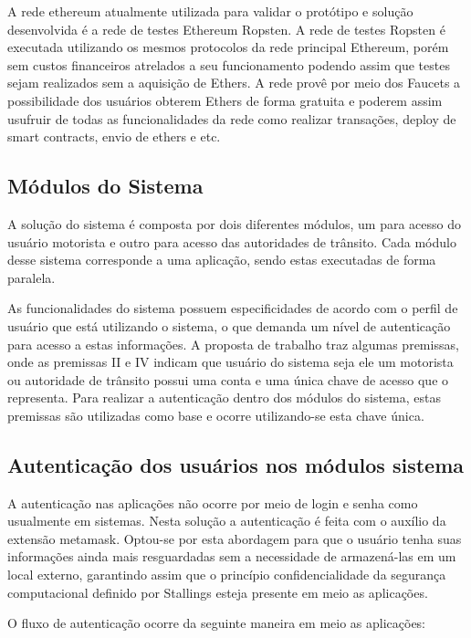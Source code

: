 A rede ethereum atualmente utilizada para validar o protótipo e solução desenvolvida é a rede de testes Ethereum Ropsten. A rede de testes Ropsten é executada utilizando os mesmos protocolos da rede principal Ethereum, porém sem custos financeiros atrelados a seu funcionamento podendo assim que testes sejam realizados sem a aquisição de Ethers. A rede provê por meio dos Faucets  a possibilidade dos usuários obterem Ethers de forma gratuita e poderem assim usufruir de todas as funcionalidades da rede como realizar transações, deploy de smart contracts, envio de ethers e etc.

\subsection{Módulos do Sistema}

A solução do sistema é composta por dois diferentes módulos, um para acesso do usuário motorista e outro para acesso das autoridades de trânsito. Cada módulo desse sistema corresponde a uma aplicação, sendo estas executadas de forma paralela.

As funcionalidades do sistema possuem especificidades de acordo com o perfil de usuário que está utilizando o sistema, o que demanda um nível de autenticação para acesso a estas informações. A proposta de trabalho traz algumas premissas, onde as premissas II e IV indicam que  usuário do sistema seja ele um motorista ou autoridade de trânsito possui uma conta e uma única chave de acesso que o representa. Para realizar a autenticação dentro dos módulos do sistema, estas premissas são utilizadas como base e ocorre utilizando-se esta chave única.

\subsection{Autenticação dos usuários nos módulos sistema}

A autenticação nas aplicações não ocorre por meio de login e senha como usualmente em sistemas. Nesta solução a autenticação é feita com o auxílio da extensão metamask. Optou-se por esta abordagem para que o usuário tenha suas informações ainda mais resguardadas sem a necessidade de armazená-las em um local externo, garantindo assim que o princípio confidencialidade da segurança computacional definido por Stallings esteja presente em meio as aplicações.

O fluxo de autenticação ocorre da seguinte maneira em meio as aplicações:

